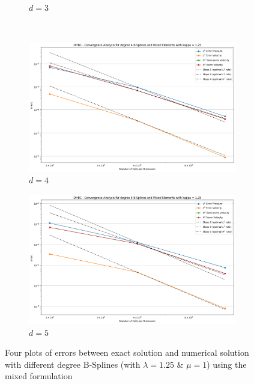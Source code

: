 \documentclass[a4paper,12pt,twoside]{report}
\begin{document}
\begin{figure}[!h]
\begin{subfigure}[b]{0.49\textwidth}
		\caption{$d=3$}
		\label{fig:convergencedegree3mixeddirichlethomogeneouskappa1}
	\end{subfigure}
	\\
	\begin{subfigure}[b]{0.49\textwidth}
		\centering
		\includegraphics[width=\textwidth]{convergence_degree_4_mixed_dirichlet_homogeneous_kappa=1.25}
		\caption{$d=4$}
		\label{fig:convergencedegree4mixeddirichlethomogeneouskappa1}
	\end{subfigure}
	\begin{subfigure}[b]{0.49\textwidth}
		\centering
		\includegraphics[width=\textwidth]{convergence_degree_5_mixed_dirichlet_homogeneous_kappa=1.25}
		\caption{$d=5$}
		\label{fig:convergencedegree5mixeddirichlethomogeneouskappa1}
	\end{subfigure}
	\caption{Four plots of errors between exact solution and numerical solution with different degree B-Splines (with $\lambda = 1.25$  \& $\mu = 1$) using the mixed formulation}
\end{figure}
\end{document}
